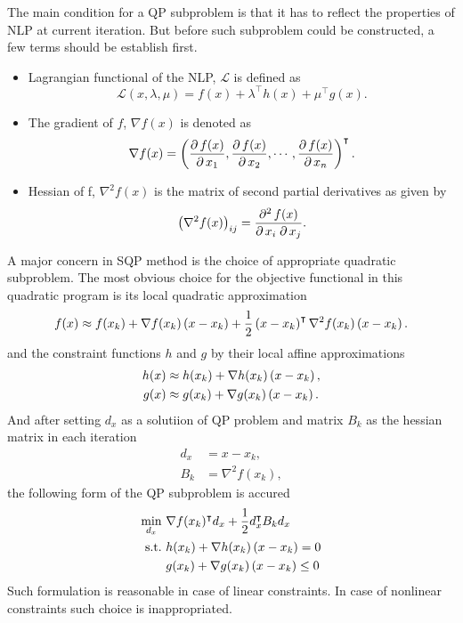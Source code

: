 The main condition for a QP subproblem is that it has to reflect the properties of NLP at current iteration. But before such subproblem could be constructed, a few terms should be establish first.
\begin{itemize}
	\item Lagrangian functional of the NLP, $\mathcal{L}$ is defined as\begin{equation}
		\mathcal{L}(x,\lambda,\mu) = f(x) + \lambda^\intercal h(x) + \mu^\intercal g(x). 
	\end{equation}
	\item The gradient of $f$, $\nabla f(x)$ is denoted as
	\begin{equation}
		\nabla f(x) = \left( \frac{\partial\, f(x)}{\partial\, x_1},\frac{\partial\, f(x)}{\partial\, x_2},\cdots,\frac{\partial\, f(x)}{\partial\, x_n} \right)^\intercal.
	\end{equation}
	\item Hessian of f, $\nabla^2f(x)$ is the matrix of second partial derivatives as given by
	\begin{equation}
		\left( \nabla^2f(x) \right)_{ij} = \frac{\partial^2\, f(x)}{\partial\, x_i\; \partial\, x_j}.
	\end{equation}
\end{itemize}
A major concern in SQP method is the choice of appropriate quadratic subproblem. 
The most obvious choice for the objective functional in this quadratic program is its local quadratic approximation
\begin{equation}
f(x)\approx f(x_k)+\nabla f(x_k)\left( x-x_k \right)+\frac{1}{2}\left( x-x_k \right)^\intercal \nabla^2f(x_k)\left( x-x_k \right).
\end{equation}
and the constraint functions $h$ and $g$ by their local affine approximations
\begin{subequations}
	\begin{align}
		h(x)&\approx h(x_k)+\nabla h(x_k)\left( x-x_k \right),\\
		g(x)&\approx g(x_k)+\nabla g(x_k)\left( x-x_k \right).	
	\end{align}
\end{subequations}
And after setting $d_x$ as a solutiion of QP problem and matrix $B_k$ as the hessian matrix in each iteration
\begin{subequations}
	\begin{align}
		d_x&=x-x_k,\\
		B_k &= \nabla^2f(x_k),
	\end{align}
\end{subequations}
the following form of the QP subproblem is accured
\begin{subequations}
	\begin{align}
		\min_{d_x}\  &\nabla f(x_k)^\intercal d_x+\frac{1}{2}d_x^\intercal B_k d_x\\
		\text{s.t.}\  &h(x_k)+\nabla h(x_k)\left( x-x_k \right) = 0\\
		&g(x_k)+\nabla g(x_k)\left( x-x_k \right)\leq 0
	\end{align}
\end{subequations}
Such formulation is reasonable in case of linear constraints. In case of nonlinear constraints such choice is inappropriated. 

